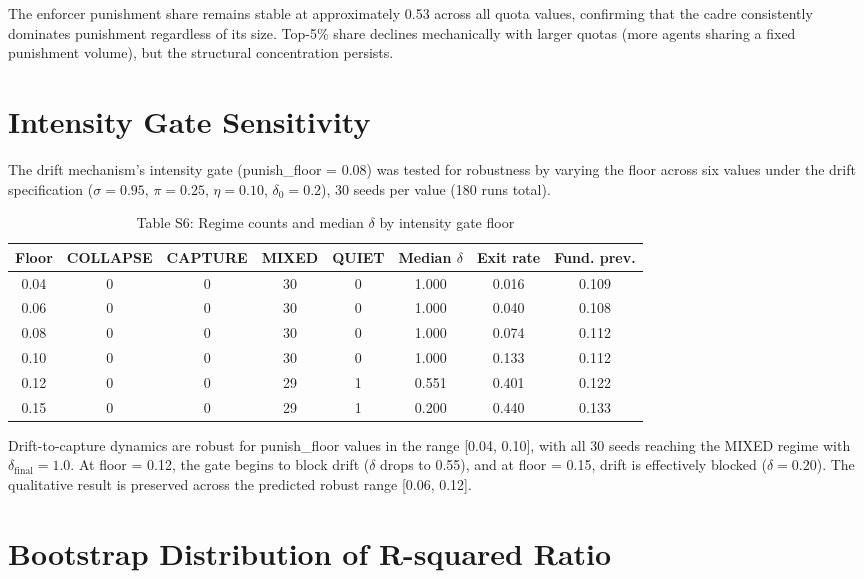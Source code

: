 \documentclass[12pt]{article}
\begin{document}
The enforcer punishment share remains stable at approximately 0.53 across all quota values, confirming that the cadre consistently dominates punishment regardless of its size. Top-5\% share declines mechanically with larger quotas (more agents sharing a fixed punishment volume), but the structural concentration persists.


\section{Intensity Gate Sensitivity}

The drift mechanism's intensity gate (punish\_floor = 0.08) was tested for robustness by varying the floor across six values under the drift specification ($\sigma = 0.95$, $\pi = 0.25$, $\eta = 0.10$, $\delta_0 = 0.2$), 30 seeds per value (180 runs total).

\begin{table}[h]
\centering
\caption{Table S6: Regime counts and median $\delta$ by intensity gate floor}
\begin{tabular}{cccccccc}
\toprule
Floor & COLLAPSE & CAPTURE & MIXED & QUIET & Median $\delta$ & Exit rate & Fund. prev. \\
\midrule
0.04 & 0 & 0 & 30 & 0 & 1.000 & 0.016 & 0.109 \\
0.06 & 0 & 0 & 30 & 0 & 1.000 & 0.040 & 0.108 \\
0.08 & 0 & 0 & 30 & 0 & 1.000 & 0.074 & 0.112 \\
0.10 & 0 & 0 & 30 & 0 & 1.000 & 0.133 & 0.112 \\
0.12 & 0 & 0 & 29 & 1 & 0.551 & 0.401 & 0.122 \\
0.15 & 0 & 0 & 29 & 1 & 0.200 & 0.440 & 0.133 \\
\bottomrule
\end{tabular}
\end{table}

Drift-to-capture dynamics are robust for punish\_floor values in the range [0.04, 0.10], with all 30 seeds reaching the MIXED regime with $\delta_{\text{final}} = 1.0$. At floor = 0.12, the gate begins to block drift ($\delta$ drops to 0.55), and at floor = 0.15, drift is effectively blocked ($\delta = 0.20$). The qualitative result is preserved across the predicted robust range [0.06, 0.12].


\section{Bootstrap Distribution of R-squared Ratio}
\end{document}
